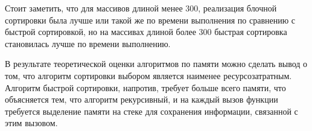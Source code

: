 Стоит заметить, что для массивов длиной менее 300, реализация блочной сортировки была лучше или такой же по времени выполнения по сравнению с быстрой сортировкой, но на массивах длиной более 300 быстрая сортировка становилась лучше по времени выполнению.

В результате теоретической оценки алгоритмов по памяти можно сделать вывод о том, что алгоритм сортировки выбором является наименее ресурсозатратным.
Алгоритм быстрой сортировки, напротив, требует больше всего памяти, что объясняется тем, что алгоритм рекурсивный, и на каждый вызов функции требуется выделение памяти на стеке для сохранения информации, связанной с этим вызовом.
